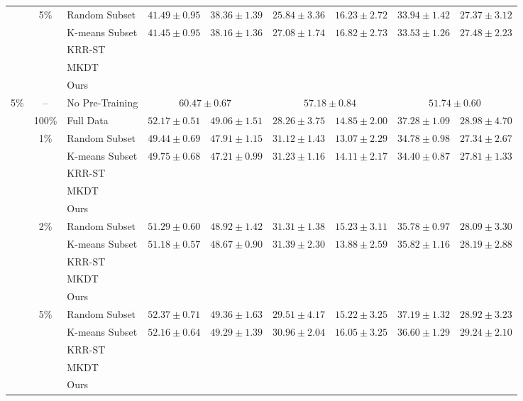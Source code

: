 \begin{table}[t]
{\begin{tabular}{@{}cclcccccc@{}}
& \multirow{5}{*}{5\%} & Random Subset
& $41.49 \pm 0.95$ & $38.36 \pm 1.39$
& $25.84 \pm 3.36$ & $16.23 \pm 2.72$
& $33.94 \pm 1.42$ & $27.37 \pm 3.12$ \\
& & K-means Subset
& $41.45 \pm 0.95$ & $38.16 \pm 1.36$
& $27.08 \pm 1.74$ & $16.82 \pm 2.73$
& $33.53 \pm 1.26$ & $27.48 \pm 2.23$ \\
& & KRR-ST & & & & & & \\
& & MKDT & & & & & & \\
& & Ours & & & & & & \\

\midrule

\multirow{17}{*}{5\%}
& -- & No Pre-Training
& \multicolumn{2}{c}{$60.47 \pm 0.67$}
& \multicolumn{2}{c}{$57.18 \pm 0.84$}
& \multicolumn{2}{c}{$51.74 \pm 0.60$} \\
\cmidrule(lr){2-9}

& 100\% & Full Data
& $52.17 \pm 0.51$ & $49.06 \pm 1.51$
& $28.26 \pm 3.75$ & $14.85 \pm 2.00$
& $37.28 \pm 1.09$ & $28.98 \pm 4.70$ \\
\cmidrule(lr){2-9}

& \multirow{5}{*}{1\%} & Random Subset
& $49.44 \pm 0.69$ & $47.91 \pm 1.15$
& $31.12 \pm 1.43$ & $13.07 \pm 2.29$
& $34.78 \pm 0.98$ & $27.34 \pm 2.67$ \\
& & K-means Subset
& $49.75 \pm 0.68$ & $47.21 \pm 0.99$
& $31.23 \pm 1.16$ & $14.11 \pm 2.17$
& $34.40 \pm 0.87$ & $27.81 \pm 1.33$ \\
& & KRR-ST & & & & & & \\
& & MKDT & & & & & & \\
& & Ours & & & & & & \\
\cmidrule(lr){2-9}

& \multirow{5}{*}{2\%} & Random Subset
& $51.29 \pm 0.60$ & $48.92 \pm 1.42$
& $31.31 \pm 1.38$ & $15.23 \pm 3.11$
& $35.78 \pm 0.97$ & $28.09 \pm 3.30$ \\
& & K-means Subset
& $51.18 \pm 0.57$ & $48.67 \pm 0.90$
& $31.39 \pm 2.30$ & $13.88 \pm 2.59$
& $35.82 \pm 1.16$ & $28.19 \pm 2.88$ \\
& & KRR-ST & & & & & & \\
& & MKDT & & & & & & \\
& & Ours & & & & & & \\
\cmidrule(lr){2-9}

& \multirow{5}{*}{5\%} & Random Subset
& $52.37 \pm 0.71$ & $49.36 \pm 1.63$
& $29.51 \pm 4.17$ & $15.22 \pm 3.25$
& $37.19 \pm 1.32$ & $28.92 \pm 3.23$ \\
& & K-means Subset
& $52.16 \pm 0.64$ & $49.29 \pm 1.39$
& $30.96 \pm 2.04$ & $16.05 \pm 3.25$
& $36.60 \pm 1.29$ & $29.24 \pm 2.10$ \\
& & KRR-ST & & & & & & \\
& & MKDT & & & & & & \\
& & Ours & & & & & & \\

\bottomrule
\end{tabular}%
}
\end{table}

